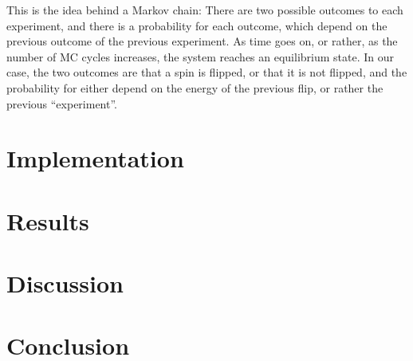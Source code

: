 \documentclass[a4paper,10pt,english]{article}
\begin{document}
This is the idea behind a Markov chain: There are two possible outcomes to each experiment, and there is a probability for each outcome, which depend on the previous outcome of the previous experiment. As time goes on, or rather, as the number of MC cycles increases, the system reaches an equilibrium state. In our case, the two outcomes are that a spin is flipped, or that it is not flipped, and the probability for either depend on the energy of the previous flip, or rather the previous ``experiment''.


\section{Implementation}





\section{Results}



\section{Discussion}


\section{Conclusion}









\end{document}
